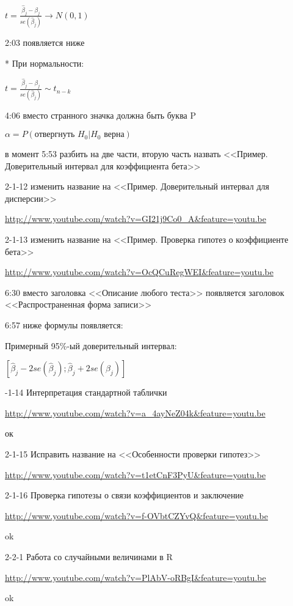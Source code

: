 \documentclass[12pt,a4paper]{article}
\begin{document}
$t=\frac{\hat{\beta}_j-\beta_j}{se(\hat{\beta}_j)} \to N(0,1)$

2:03 появляется ниже 

* При нормальности: 

$t=\frac{\hat{\beta}_j-\beta_j}{se(\hat{\beta}_j)} \sim t_{n-k}$

4:06 вместо странного значка должна быть буква P

$\alpha = P(\text{отвергнуть }H_0 | H_0 \text{ верна})$


в момент 5:53 разбить на две части, вторую часть назвать <<Пример. Доверительный интервал для коэффициента бета>>


 

2-1-12 изменить название на <<Пример. Доверительный интервал для дисперсии>>

\url{http://www.youtube.com/watch?v=GI21j9Co0_A&feature=youtu.be}

 

2-1-13 изменить название на <<Пример. Проверка гипотез о коэффициенте бета>>

\url{http://www.youtube.com/watch?v=OcQCuRegWEI&feature=youtu.be}


6:30 вместо заголовка <<Описание любого теста>> появляется заголовок <<Распространенная форма записи>>

6:57 ниже формулы появляется:

Примерный 95\%-ый доверительный интервал: 

$[\hat{\beta}_j - 2se(\hat{\beta}_j); \hat{\beta}_j + 2se(\hat{\beta}_j)]$

-1-14 Интерпретация стандартной таблички

\url{http://www.youtube.com/watch?v=a_4ayNeZ04k&feature=youtu.be}

ок

2-1-15 Исправить название на <<Особенности проверки гипотез>>

\url{http://www.youtube.com/watch?v=t1etCnF3PyU&feature=youtu.be}

 

2-1-16 Проверка гипотезы о связи коэффициентов и заключение 

\url{http://www.youtube.com/watch?v=f-OVbtCZYvQ&feature=youtu.be}

ok

2-2-1 Работа со случайными величинами в R

\url{http://www.youtube.com/watch?v=PlAbV-oRBgI&feature=youtu.be}

ok
\end{document}
